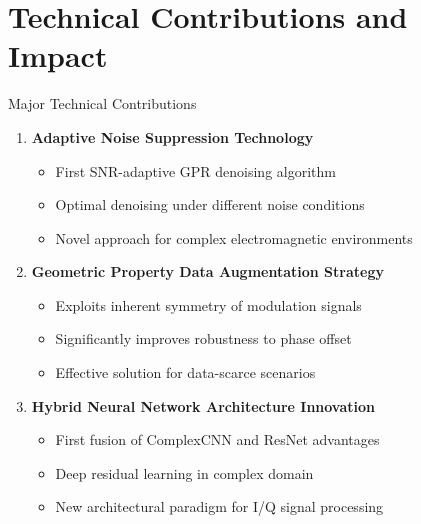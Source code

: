 \documentclass[aspectratio=169]{beamer}
\begin{document}
\section{Technical Contributions and Impact}

\begin{frame}{Major Technical Contributions}
\begin{enumerate}
\item \textbf{Adaptive Noise Suppression Technology}
\begin{itemize}
\item First SNR-adaptive GPR denoising algorithm
\item Optimal denoising under different noise conditions
\item Novel approach for complex electromagnetic environments
\end{itemize}

\item \textbf{Geometric Property Data Augmentation Strategy}
\begin{itemize}
\item Exploits inherent symmetry of modulation signals
\item Significantly improves robustness to phase offset
\item Effective solution for data-scarce scenarios
\end{itemize}

\item \textbf{Hybrid Neural Network Architecture Innovation}
\begin{itemize}
\item First fusion of ComplexCNN and ResNet advantages
\item Deep residual learning in complex domain
\item New architectural paradigm for I/Q signal processing
\end{itemize}
\end{enumerate}
\end{frame}
\end{document}
